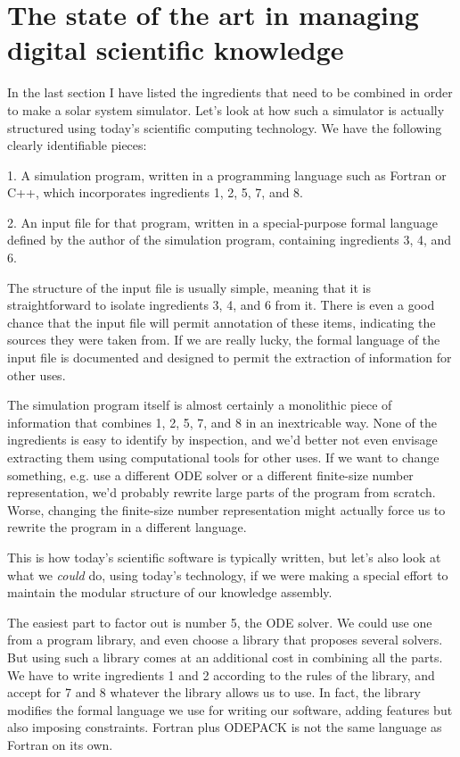 \section{The state of the art in managing digital scientific knowledge}
\label{state-of-the-art}

In the last section I have listed the ingredients that need to be combined in order to make a solar system simulator. Let's look at how such a simulator is actually structured using today's scientific computing technology. We have the following clearly identifiable pieces:

  1. A simulation program, written in a programming language such as Fortran or C++, which incorporates ingredients 1, 2, 5, 7, and 8.

  2. An input file for that program, written in a special-purpose formal language defined by the author of the simulation program, containing ingredients 3, 4, and 6.

The structure of the input file is usually simple, meaning that it is straightforward to isolate ingredients 3, 4, and 6 from it. There is even a good chance that the input file will permit annotation of these items, indicating the sources they were taken from. If we are really lucky, the formal language of the input file is documented and designed to permit the extraction of information for other uses.

The simulation program itself is almost certainly a monolithic piece of information that combines 1, 2, 5, 7, and 8 in an inextricable way. None of the ingredients is easy to identify by inspection, and we'd better not even envisage extracting them using computational tools for other uses. If we want to change something, e.g. use a different ODE solver or a different finite-size number representation, we'd probably rewrite large parts of the program from scratch. Worse, changing the finite-size number representation might actually force us to rewrite the program in a different language.

This is how today's scientific software is typically written, but let's also look at what we \textit{could} do, using today's technology, if we were making a special effort to maintain the modular structure of our knowledge assembly.

The easiest part to factor out is number 5, the ODE solver. We could use one from a program library, and even choose a library that proposes several solvers. But using such a library comes at an additional cost in combining all the parts. We have to write ingredients 1 and 2 according to the rules of the library, and accept for 7 and 8 whatever the library allows us to use. In fact, the library modifies the formal language we use for writing our software, adding features but also imposing constraints. Fortran plus ODEPACK is not the same language as Fortran on its own.

